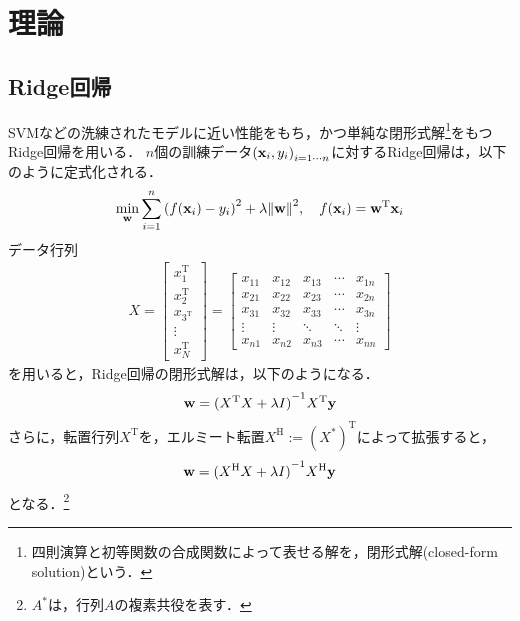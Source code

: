 \documentclass[11pt,a4j]{jarticle}
\newcommand\norm[1]{\left\lVert#1\right\rVert}
\begin{document}
  \section{理論}
    \subsection{Ridge回帰}
      SVMなどの洗練されたモデルに近い性能をもち，かつ単純な閉形式解\footnote{四則演算と初等関数の合成関数によって表せる解を，閉形式解(closed-form solution)という．}をもつRidge回帰を用いる．
      $n$個の訓練データ${({\bf x}_i, y_i)}_{i = 1 \cdots n}$に対するRidge回帰は，以下のように定式化される．
      \begin{align}
        \min_{\bf w} \sum_{i=1}^{n} { \left( f({\bf x}_i) - y_i \right) }^{2} + \lambda {\norm{ \bf w }}^{2}, ~~~
        f({\bf x}_i) = {\bf w}^{\mathrm{T}} {\bf x}_i
      \end{align}
      データ行列
      \begin{align}
        X = 
        \left[
          \begin{array}{c}
            x_{1}^{\mathrm{T}} \\
            x_{2}^{\mathrm{T}} \\
            x_{3^{\mathrm{T}}} \\
            \vdots \\
            x_{N}^{\mathrm{T}} 
          \end{array}
        \right]
        =
        \left[
          \begin{array}{ccccc}
            x_{11} & x_{12} & x_{13} & \cdots & x_{1n} \\
            x_{21} & x_{22} & x_{23} & \cdots & x_{2n} \\
            x_{31} & x_{32} & x_{33} & \cdots & x_{3n} \\
            \vdots&\vdots&\ddots&\ddots&\vdots \\
            x_{n1} & x_{n2} & x_{n3} & \cdots & x_{nn} 
          \end{array}
        \right]
      \end{align}
      を用いると，Ridge回帰の閉形式解は，以下のようになる．
      \begin{align}
        {\bf w} = { ({X}^{\mathrm{T}} X + \lambda I) }^{-1} {X}^{\mathrm{T}} {\bf y}
      \end{align}
      さらに，転置行列$X^{\mathrm{T}}$を，エルミート転置$X^{\mathrm{H}} := {(X^{*})}^{\mathrm{T}}$によって拡張すると，
      \begin{align}
        {\bf w} = { ({X}^{\mathrm{H}} X + \lambda I) }^{-1} {X}^{\mathrm{H}} {\bf y}
      \end{align}
      となる．\footnote{$A^{*}$は，行列$A$の複素共役を表す．}
\end{document}
